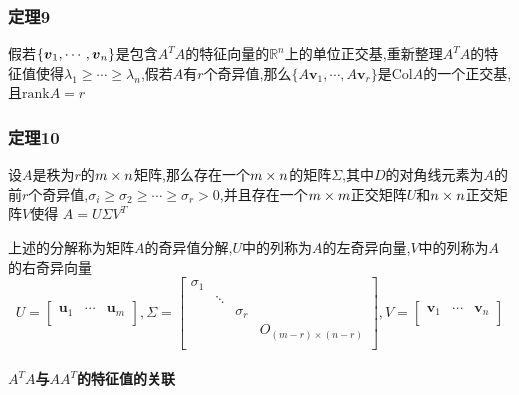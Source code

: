 \documentclass{article}
\newcommand{\RR}{\mathbb{R}}
\newcommand{\ve}{\boldsymbol}
\newcommand{\col}{\text{Col}}
\begin{document}
\begin{CJK}{UTF8}{gkai}
\subsubsection{定理9}
假若$\{\vs{v}{1}{n}\}$是包含$A^T A$的特征向量的$\RR^n$上的单位正交基,重新整理$A^T A$的特征值使得$\lambda_1 \geq \cdots \geq \lambda_n$,假若$A$有$r$个奇异值,那么$\{A\ve{v}_1,\cdots , A\ve{v}_r\}$是$\col A$的一个正交基,且$\text{rank} A = r$

\subsubsection{定理10}
设$A$是秩为$r$的$m\times n$矩阵,那么存在一个$m\times n$的矩阵$\Sigma$,其中$D$的对角线元素为$A$的前$r$个奇异值,$\sigma_i \geq \sigma_2 \geq \cdots \geq \sigma_r > 0$,并且存在一个$m\times m$正交矩阵$U$和$n\times n$正交矩阵$V$使得 $A = U \Sigma V^T$ 

上述的分解称为矩阵$A$的奇异值分解,$U$中的列称为$A$的左奇异向量,$V$中的列称为$A$的右奇异向量
\[U = 
\begin{bmatrix}
    \ve{u}_1&\cdots& \ve{u}_m\\
\end{bmatrix}  ,
\Sigma = \begin{bmatrix}
    \sigma_1 &&&\\
    &\ddots&&\\
    &&\sigma_r&\\
    &&&O_{(m- r)\times (n - r)}\\
\end{bmatrix}
, V =
\begin{bmatrix}
    \ve{v}_1&\cdots&\ve{v}_n\\
\end{bmatrix}
\]
\paragraph{$A^TA$与$AA^T$的特征值的关联}


\end{CJK}
\end{document}
